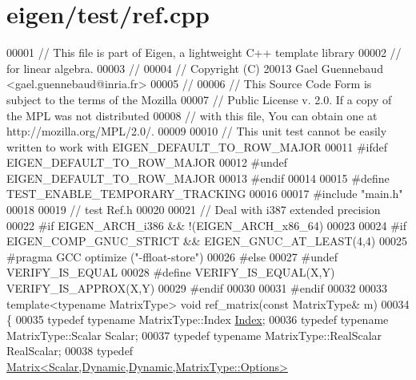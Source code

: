 \hypertarget{eigen_2test_2ref_8cpp_source}{}\section{eigen/test/ref.cpp}
\label{eigen_2test_2ref_8cpp_source}

\begin{DoxyCode}
00001 \textcolor{comment}{// This file is part of Eigen, a lightweight C++ template library}
00002 \textcolor{comment}{// for linear algebra.}
00003 \textcolor{comment}{//}
00004 \textcolor{comment}{// Copyright (C) 20013 Gael Guennebaud <gael.guennebaud@inria.fr>}
00005 \textcolor{comment}{//}
00006 \textcolor{comment}{// This Source Code Form is subject to the terms of the Mozilla}
00007 \textcolor{comment}{// Public License v. 2.0. If a copy of the MPL was not distributed}
00008 \textcolor{comment}{// with this file, You can obtain one at http://mozilla.org/MPL/2.0/.}
00009 
00010 \textcolor{comment}{// This unit test cannot be easily written to work with EIGEN\_DEFAULT\_TO\_ROW\_MAJOR}
00011 \textcolor{preprocessor}{#ifdef EIGEN\_DEFAULT\_TO\_ROW\_MAJOR}
00012 \textcolor{preprocessor}{#undef EIGEN\_DEFAULT\_TO\_ROW\_MAJOR}
00013 \textcolor{preprocessor}{#endif}
00014 
00015 \textcolor{preprocessor}{#define TEST\_ENABLE\_TEMPORARY\_TRACKING}
00016 
00017 \textcolor{preprocessor}{#include "main.h"}
00018 
00019 \textcolor{comment}{// test Ref.h}
00020 
00021 \textcolor{comment}{// Deal with i387 extended precision}
00022 \textcolor{preprocessor}{#if EIGEN\_ARCH\_i386 && !(EIGEN\_ARCH\_x86\_64)}
00023 
00024 \textcolor{preprocessor}{#if EIGEN\_COMP\_GNUC\_STRICT && EIGEN\_GNUC\_AT\_LEAST(4,4)}
00025 \textcolor{preprocessor}{#pragma GCC optimize ("-ffloat-store")}
00026 \textcolor{preprocessor}{#else}
00027 \textcolor{preprocessor}{#undef VERIFY\_IS\_EQUAL}
00028 \textcolor{preprocessor}{#define VERIFY\_IS\_EQUAL(X,Y) VERIFY\_IS\_APPROX(X,Y)}
00029 \textcolor{preprocessor}{#endif}
00030 
00031 \textcolor{preprocessor}{#endif}
00032 
00033 \textcolor{keyword}{template}<\textcolor{keyword}{typename} MatrixType> \textcolor{keywordtype}{void} ref\_matrix(\textcolor{keyword}{const} MatrixType& m)
00034 \{
00035   \textcolor{keyword}{typedef} \textcolor{keyword}{typename} MatrixType::Index \hyperlink{namespace_eigen_a62e77e0933482dafde8fe197d9a2cfde}{Index};
00036   \textcolor{keyword}{typedef} \textcolor{keyword}{typename} MatrixType::Scalar Scalar;
00037   \textcolor{keyword}{typedef} \textcolor{keyword}{typename} MatrixType::RealScalar RealScalar;
00038   \textcolor{keyword}{typedef} \hyperlink{group___core___module_class_eigen_1_1_matrix}{Matrix<Scalar,Dynamic,Dynamic,MatrixType::Options>}

\end{DoxyCode}
